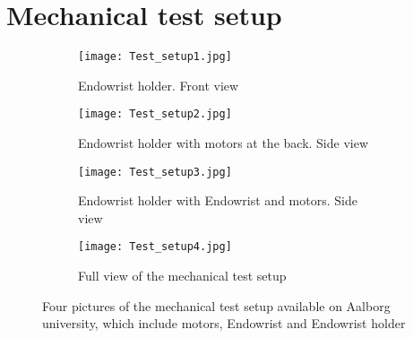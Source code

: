 \section{Mechanical test setup}\label{sec:Mechanical_testsetup.tex}

\begin{figure}[H]
	\centering
	\begin{minipage}[t]{0.9\textwidth}
	\begin{subfigure}{0.45\textwidth}
		\vspace{-10pt}
		\centering
		\texttt{[image: Test\_setup1.jpg]}
		\caption{Endowrist holder. Front view}
		\label{fig:motor}
	\end{subfigure}
	\hspace{\fill}
	\begin{subfigure}{0.45\textwidth}
		\centering
		\texttt{[image: Test\_setup2.jpg]}
		\caption{Endowrist holder with motors at the back. Side view}
		\label{fig:motor_gear}
	\end{subfigure}
	\end{minipage}

	\begin{minipage}[t]{0.9\textwidth}
	\vspace{20pt}
	\begin{subfigure}{0.45\textwidth}
		\vspace{0pt}
		\centering
		\texttt{[image: Test\_setup3.jpg]}
		\caption{Endowrist holder with Endowrist and motors. Side view}
		\label{fig:motor}
	\end{subfigure}
	\hspace{\fill}
	\begin{subfigure}{0.45\textwidth}
		\centering
		\texttt{[image: Test\_setup4.jpg]}
		\caption{Full view of the mechanical test setup}
		\label{fig:motor_gear}
	\end{subfigure}
	\end{minipage}

	\caption{Four pictures of the mechanical test setup available on Aalborg university, which include motors, Endowrist and Endowrist holder}
	\label{fig:Full_motor _dis}
\end{figure}